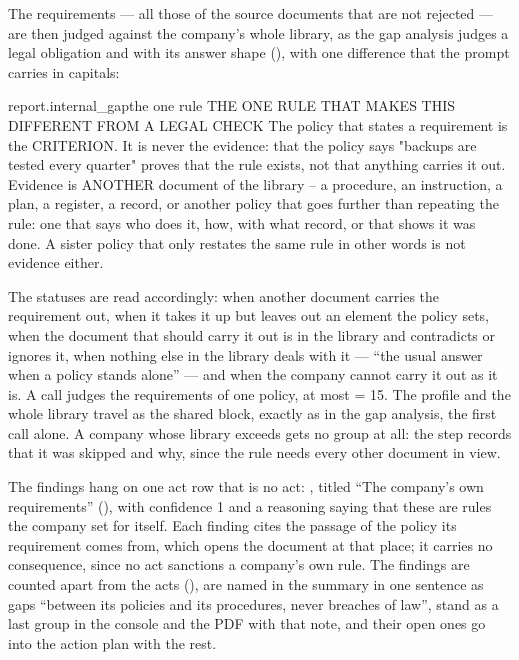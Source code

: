 The requirements --- all those of the source documents that are not rejected --- are then judged
against the company's whole library, as the gap analysis judges a legal obligation and with its
answer shape (), with one difference that the prompt carries in capitals:

\begin{promptexcerpt}{report.internal_gap}{the one rule}
  THE ONE RULE THAT MAKES THIS DIFFERENT FROM A LEGAL CHECK
  The policy that states a requirement is the CRITERION. It is never the evidence: that the policy says "backups are tested every quarter" proves that the rule exists, not that anything carries it out. Evidence is ANOTHER document of the library – a procedure, an instruction, a plan, a register, a record, or another policy that goes further than repeating the rule: one that says who does it, how, with what record, or that shows it was done. A sister policy that only restates the same rule in other words is not evidence either.
\end{promptexcerpt}

The statuses are read accordingly:  when another document carries the requirement
out,  when it takes it up but leaves out an element the policy sets,
 when the document that should carry it out is in the library and contradicts or
ignores it,  when nothing else in the library deals with it --- \enquote{the usual
answer when a policy stands alone} --- and  when the company cannot carry it out as it
is. A call judges the requirements of one policy, at most  = 15. The profile and
the whole library travel as the shared block, exactly as in the gap analysis, the first call
alone. A company whose library exceeds  gets no group at all: the
step records that it was skipped and why, since the rule needs every other document in view.

The findings hang on one act row that is no act:  , titled
\enquote{The company's own requirements} (), with confidence 1
and a reasoning saying that these are rules the company set for itself. Each finding cites the
passage of the policy its requirement comes from, which opens the document at that place; it
carries no consequence, since no act sanctions a company's own rule. The findings are counted
apart from the acts (), are named in the summary in one sentence as gaps
\enquote{between its policies and its procedures, never breaches of law}, stand as a last group
in the console and the PDF with that note, and their open ones go into the action plan with the
rest.

